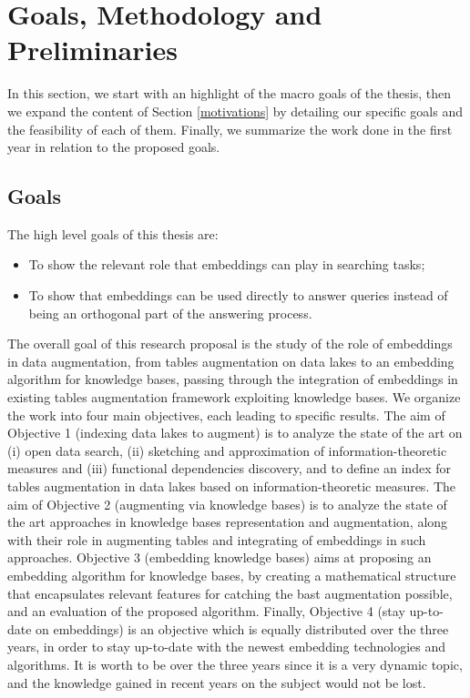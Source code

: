 \section{Goals, Methodology and Preliminaries}\label{goals}
In this section, we start with an highlight of the macro goals of the thesis, then we expand the content of Section \ref{motivations} by detailing our specific goals and the feasibility of each of them. Finally, we summarize the work done in the first year in relation to the proposed goals.

\subsection{Goals}\label{sub_goals}
The high level goals of this thesis are:
\begin{itemize}
    \item To show the relevant role that embeddings can play in searching tasks;
    \item To show that embeddings can be used directly to answer queries instead of being an orthogonal part of the answering process.
\end{itemize}

The overall goal of this research proposal is the study of the role of embeddings in data augmentation, from tables augmentation on data lakes to an embedding algorithm for knowledge bases, passing through the integration of embeddings in existing tables augmentation framework exploiting knowledge bases. We organize the work into four main objectives, each leading to specific results. 
The aim of Objective 1 (indexing data lakes to augment) is to analyze the state of the art on (i) open data search, (ii) sketching and approximation of information-theoretic measures and (iii) functional dependencies discovery, and to define an index for tables augmentation in data lakes based on information-theoretic measures. 
The aim of Objective 2 (augmenting via knowledge bases) is to analyze the state of the art approaches in knowledge bases representation and augmentation, along with their role in augmenting tables and integrating of embeddings in such approaches. 
Objective 3 (embedding knowledge bases) aims at proposing an embedding algorithm for knowledge bases, by creating a mathematical structure that encapsulates relevant features for catching the bast augmentation possible, and an evaluation of the proposed algorithm. 
Finally, Objective 4 (stay up-to-date on embeddings) is an objective which is equally distributed over the three years, in order to stay up-to-date with the newest embedding technologies and algorithms. It is worth to be over the three years since it is a very dynamic topic, and the knowledge gained in recent years on the subject would not be lost.

